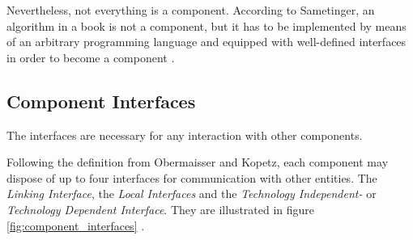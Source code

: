 Nevertheless, not everything is a component. According to Sametinger, an algorithm in a book is not a component, but it has to be implemented by means of an arbitrary programming language and equipped with well-defined interfaces in order to become a component \cite[p.2-3]{sametinger}.


\subsection{Component Interfaces}
\label{sec:component_interfaces}
The interfaces are necessary for any interaction with other components.

Following the definition from Obermaisser and Kopetz, each component may dispose of up to four interfaces for communication with other entities. The \emph{Linking Interface}, the \emph{Local Interfaces} and the \emph{Technology Independent-} or \emph{Technology Dependent Interface}. They are illustrated in figure \ref{fig:component_interfaces} \cite[p.40-41]{genesys}.

